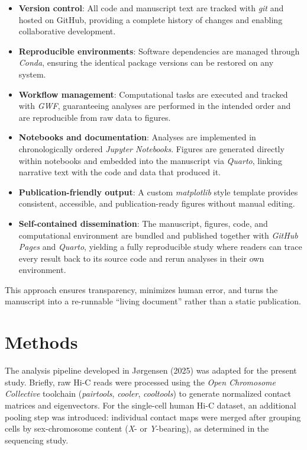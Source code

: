 \documentclass[
  10pt,
  a4paper,
  openany]{scrbook}
\providecommand{\tightlist}{%
  \setlength{\itemsep}{0pt}\setlength{\parskip}{0pt}}
\begin{document}
\begin{itemize}
\tightlist
\item
  \textbf{Version control}: All code and manuscript text are tracked
  with \emph{git} and hosted on GitHub, providing a complete history of
  changes and enabling collaborative development.\\
\item
  \textbf{Reproducible environments}: Software dependencies are managed
  through \emph{Conda}, ensuring the identical package versions can be
  restored on any system.\\
\item
  \textbf{Workflow management}: Computational tasks are executed and
  tracked with \emph{GWF}, guaranteeing analyses are performed in the
  intended order and are reproducible from raw data to figures.\\
\item
  \textbf{Notebooks and documentation}: Analyses are implemented in
  chronologically ordered \emph{Jupyter Notebooks}. Figures are
  generated directly within notebooks and embedded into the manuscript
  via \emph{Quarto}, linking narrative text with the code and data that
  produced it.\\
\item
  \textbf{Publication-friendly output}: A custom \emph{matplotlib} style
  template provides consistent, accessible, and publication-ready
  figures without manual editing.\\
\item
  \textbf{Self-contained dissemination}: The manuscript, figures, code,
  and computational environment are bundled and published together with
  \emph{GitHub Pages} and \emph{Quarto}, yielding a fully reproducible
  study where readers can trace every result back to its source code and
  rerun analyses in their own environment.
\end{itemize}

This approach ensures transparency, minimizes human error, and turns the
manuscript into a re-runnable ``living document'' rather than a static
publication.

\chapter{Methods}\label{methods}

The analysis pipeline developed in Jørgensen (2025) was adapted for the
present study. Briefly, raw Hi-C reads were processed using the
\emph{Open Chromosome Collective} toolchain (\emph{pairtools},
\emph{cooler}, \emph{cooltools}) to generate normalized contact matrices
and eigenvectors. For the single-cell human Hi-C dataset, an additional
pooling step was introduced: individual contact maps were merged after
grouping cells by sex-chromosome content (\emph{X}- or
\emph{Y}-bearing), as determined in the sequencing study.
\end{document}

